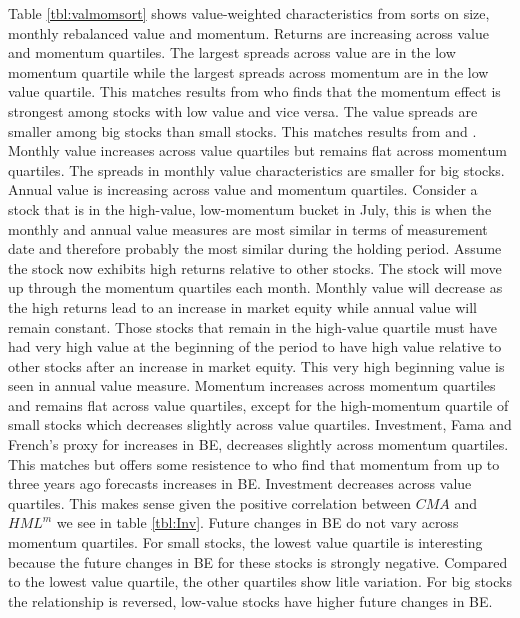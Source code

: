 Table \ref{tbl:valmomsort} shows value-weighted characteristics from sorts on size,
monthly rebalanced value and momentum. Returns are increasing across value and momentum
quartiles. The largest spreads across value are in the low momentum quartile while the
largest spreads across momentum are in the low value quartile. This matches results from
\textcite{asness1997interaction} who finds that the momentum effect is strongest among
stocks with low value and vice versa. The value spreads are smaller among big stocks than
small stocks. This matches results from \textcite{asness2015fact} and
\textcite{kok2017facts}. Monthly value increases across value quartiles but remains flat
across momentum quartiles. The spreads in monthly value characteristics are smaller for
big stocks. Annual value is increasing across value and momentum quartiles. Consider a
stock that is in the high-value, low-momentum bucket in July, this is when the monthly and
annual value measures are most similar in terms of measurement date and therefore probably
the most similar during the holding period. Assume the stock now exhibits high returns
relative to other stocks. The stock will move up through the momentum quartiles each
month. Monthly value will decrease as the high returns lead to an increase in market
equity while annual value will remain constant. Those stocks that remain in the high-value
quartile must have had very high value at the beginning of the period to have high value
relative to other stocks after an increase in market equity. This very high beginning
value is seen in annual value measure. Momentum increases across momentum quartiles and
remains flat across value quartiles, except for the high-momentum quartile of small stocks
which decreases slightly across value quartiles. Investment, Fama and French's proxy for
increases in BE, decreases slightly across momentum quartiles. This matches
\textcite{fama2016dissecting} but offers some resistence to \textcite{asness2013devil} who
find that momentum from up to three years ago forecasts increases in BE. Investment
decreases across value quartiles. This makes sense given the positive correlation between
$CMA$ and $HML^m$ we see in table \ref{tbl:Inv}. Future changes in BE do not vary
across momentum quartiles. For small stocks, the lowest value quartile is interesting
because the future changes in BE for these stocks is strongly negative. Compared to the
lowest value quartile, the other quartiles show litle variation. For big stocks the
relationship is reversed, low-value stocks have higher future changes in BE.

